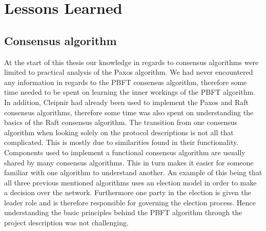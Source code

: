 \section{Lessons Learned}
\iffalse
-PBFT
-Asynchronous programming with C#, Task architecture
-Reactive Programming basics
-Overall knowledge for Cleipnir
-Issues and advantages in regards to the topics listed over. For instance a lot of time was wasted due to not fully grasping how Cleipnir work internally when performing the reactive part and the CAwaitable emission --> resulting a month of frustration trying to figure out why collision errors occur.
-Lack of documentation can be quite fatal for continued support.
-The multitude of potential issues that could occur that aren't necessary dealt with in the theoretical consensus algorithm or pseudo code.
-Cleipnir and how it interacts with the other programming paradigms. Eks: A clear distinction has to made in regards to what code is run inside Cleipnir(the persistent part) and what is not called in Cleipnir (orthogonal part), mixing these will cause disastrous results, which we infact encountered several times during implementation.
\fi

\subsection{Consensus algorithm}
At the start of this thesis our knowledge in regards to consensus algorithms were limited to practical analysis of the Paxos algorithm. We had never encountered any information in regards to the PBFT consensus algorithm, therefore some time needed to be spent on learning the inner workings of the PBFT algorithm. In addition, Cleipnir had already been used to implement the Paxos and Raft consensus algorithms, therefore some time was also spent on understanding the basics of the Raft consensus algorithm. The transition from one consensus algorithm when looking solely on the protocol descriptions is not all that complicated. This is mostly due to similarities found in their functionality. Components used to implement a functional consensus algorithm are usually shared by many consensus algorithms. This in turn makes it easier for someone familiar with one algorithm to understand another. An example of this being that all three previous mentioned algorithms uses an election model in order to make a decision over the network. Furthermore one party in the election is given the leader role and is therefore responsible for governing the election process. Hence understanding the basic principles behind the PBFT algorithm through the project description was not challenging. 

